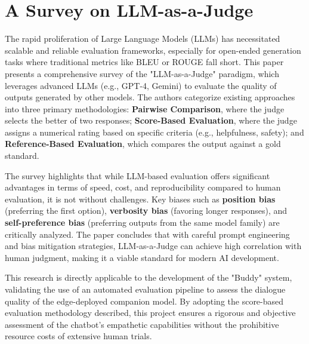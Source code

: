 \newpage
\section[A Survey on LLM-as-a-Judge]{A Survey on LLM-as-a-Judge \cite{paper_6}}
\hspace*{17pt} The rapid proliferation of Large Language Models (LLMs) has necessitated scalable and reliable evaluation frameworks, especially for open-ended generation tasks where traditional metrics like BLEU or ROUGE fall short. This paper presents a comprehensive survey of the "LLM-as-a-Judge" paradigm, which leverages advanced LLMs (e.g., GPT-4, Gemini) to evaluate the quality of outputs generated by other models. The authors categorize existing approaches into three primary methodologies: \textbf{Pairwise Comparison}, where the judge selects the better of two responses; \textbf{Score-Based Evaluation}, where the judge assigns a numerical rating based on specific criteria (e.g., helpfulness, safety); and \textbf{Reference-Based Evaluation}, which compares the output against a gold standard.

The survey highlights that while LLM-based evaluation offers significant advantages in terms of speed, cost, and reproducibility compared to human evaluation, it is not without challenges. Key biases such as \textbf{position bias} (preferring the first option), \textbf{verbosity bias} (favoring longer responses), and \textbf{self-preference bias} (preferring outputs from the same model family) are critically analyzed. The paper concludes that with careful prompt engineering and bias mitigation strategies, LLM-as-a-Judge can achieve high correlation with human judgment, making it a viable standard for modern AI development.

This research is directly applicable to the development of the "Buddy" system, validating the use of an automated evaluation pipeline to assess the dialogue quality of the edge-deployed companion model. By adopting the score-based evaluation methodology described, this project ensures a rigorous and objective assessment of the chatbot's empathetic capabilities without the prohibitive resource costs of extensive human trials.

\newpage
